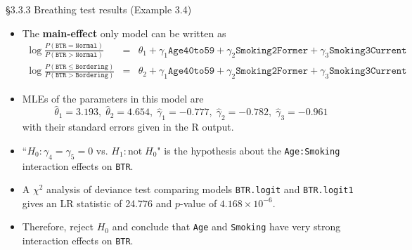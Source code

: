\documentclass{beamer}
\begin{document}
\begin{frame}{\S3.3.3 Breathing test results  (Example 3.4)}
\begin{itemize}
\item
The {\bf main-effect}  only model can be written as {\scriptsize
\begin{eqnarray*}
\log\frac{P(\texttt{BTR}=\texttt{Normal})}{P(\texttt{BTR}>\texttt{Normal})}\!\!&\!\!\!\!=\!\!\!&\!\!\!\theta_1
+ \gamma_1\texttt{Age40to59}+\gamma_2\texttt{Smoking2Former}+\gamma_3\texttt{Smoking3Current} \\
\log\frac{P(\texttt{BTR}\leq \texttt{Bordering})}{P(\texttt{BTR}>\texttt{Bordering})}\!\!&\!\!\!\!=\!\!\!&\!\!\!\theta_2
+ \gamma_1\texttt{Age40to59}+\gamma_2\texttt{Smoking2Former}+\gamma_3\texttt{Smoking3Current}
\end{eqnarray*}}
\item
MLEs of the parameters in this  model are {\scriptsize
$$\hat{\theta}_1=3.193, \;\hat{\theta}_2=4.654, \; \hat{\gamma}_1=-0.777, \;\hat{\gamma}_2=-0.782, \;
\hat{\gamma}_3=-0.961$$}
with their standard errors given in the R output.
\item
``$H_0: \gamma_4=\gamma_5=0$ vs. $H_1: \mbox{not}\; H_0$" is the hypothesis about the 
\texttt{Age:Smoking} interaction effects on \texttt{BTR}.  
\item
A $\chi^2$ analysis of deviance test comparing models \texttt{BTR.logit} and \texttt{BTR.logit1} gives 
an LR statistic of 24.776 and $p$-value of $4.168\times 10^{-6}$. 

\item Therefore, reject $H_0$ and  conclude that \texttt{Age} and \texttt{Smoking} have very strong interaction effects on \texttt{BTR}.
\end{itemize}
\end{frame}
\end{document}
